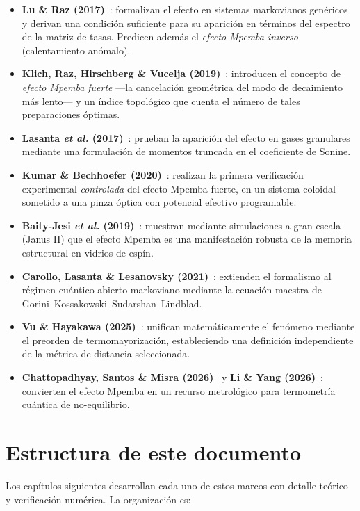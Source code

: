 \begin{itemize}
\item \textbf{Lu \& Raz (2017)}~\cite{lu2017}: formalizan el efecto en sistemas 
markovianos genéricos y derivan una condición suficiente para su aparición en 
términos del espectro de la matriz de tasas. Predicen además el \emph{efecto Mpemba 
inverso} (calentamiento anómalo).
\item \textbf{Klich, Raz, Hirschberg \& Vucelja (2019)}~\cite{klichraz2019}: 
introducen el concepto de \emph{efecto Mpemba fuerte} ---la cancelación geométrica 
del modo de decaimiento más lento--- y un índice topológico que cuenta el número 
de tales preparaciones óptimas.
\item \textbf{Lasanta \emph{et al.} (2017)}~\cite{lasanta2017}: prueban la 
aparición del efecto en gases granulares mediante una formulación de momentos 
truncada en el coeficiente de Sonine.
\item \textbf{Kumar \& Bechhoefer (2020)}~\cite{kumar2020}: realizan la primera 
verificación experimental \emph{controlada} del efecto Mpemba fuerte, en un 
sistema coloidal sometido a una pinza óptica con potencial efectivo programable.
\item \textbf{Baity-Jesi \emph{et al.} (2019)}~\cite{baityjesi2019}: muestran 
mediante simulaciones a gran escala (Janus II) que el efecto Mpemba es una 
manifestación robusta de la memoria estructural en vidrios de espín.
\item \textbf{Carollo, Lasanta \& Lesanovsky (2021)}~\cite{carollo2021}: extienden 
el formalismo al régimen cuántico abierto markoviano mediante la ecuación 
maestra de Gorini--Kossakowski--Sudarshan--Lindblad.
\item \textbf{Vu \& Hayakawa (2025)}~\cite{vuhayakawa2025}: unifican 
matemáticamente el fenómeno mediante el preorden de termomayorización, 
estableciendo una definición independiente de la métrica de distancia 
seleccionada.
\item \textbf{Chattopadhyay, Santos \& Misra (2026)}~\cite{chattopadhyay2026} y 
\textbf{Li \& Yang (2026)}~\cite{liyang2026}: convierten el efecto Mpemba en un 
recurso metrológico para termometría cuántica de no-equilibrio.
\end{itemize}

\section{Estructura de este documento}

Los capítulos siguientes desarrollan cada uno de estos marcos con detalle teórico 
y verificación numérica. La organización es:

